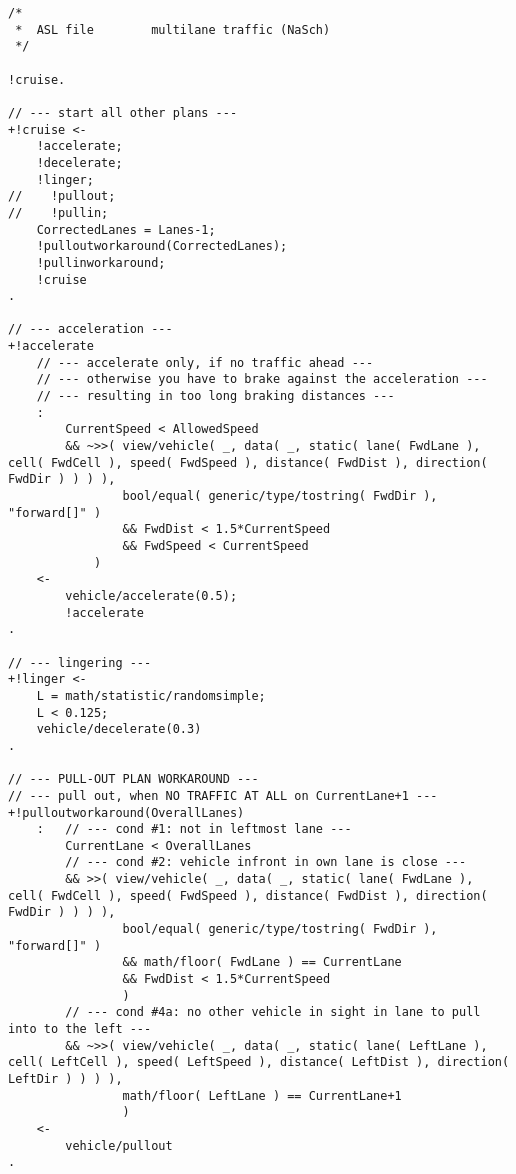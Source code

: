 \begin{lstlisting}[style=asl, 
                   keywords={+!cruise,+!accelerate,+!linger,+!decelerate,+!vehicle/collision}, 
                   keywords={[2]}, 
                   keywords={[3]}, 
                   caption={Agentenscript: NaSch-Modell, mehrspurig},
                   label={lst:multi-lane}]      
/*
 *  ASL file        multilane traffic (NaSch)
 */

!cruise.

// --- start all other plans ---
+!cruise <-
    !accelerate;
    !decelerate;
    !linger;
//    !pullout;
//    !pullin;
    CorrectedLanes = Lanes-1;
    !pulloutworkaround(CorrectedLanes);
    !pullinworkaround;
    !cruise
.

// --- acceleration ---
+!accelerate
    // --- accelerate only, if no traffic ahead ---
    // --- otherwise you have to brake against the acceleration ---
    // --- resulting in too long braking distances ---
    : 
        CurrentSpeed < AllowedSpeed
        && ~>>( view/vehicle( _, data( _, static( lane( FwdLane ), cell( FwdCell ), speed( FwdSpeed ), distance( FwdDist ), direction( FwdDir ) ) ) ),
                bool/equal( generic/type/tostring( FwdDir ), "forward[]" )
                && FwdDist < 1.5*CurrentSpeed
                && FwdSpeed < CurrentSpeed
            )
    <-
        vehicle/accelerate(0.5);
        !accelerate
.

// --- lingering ---
+!linger <-
    L = math/statistic/randomsimple;
    L < 0.125;
    vehicle/decelerate(0.3)
.

// --- PULL-OUT PLAN WORKAROUND ---
// --- pull out, when NO TRAFFIC AT ALL on CurrentLane+1 --- 
+!pulloutworkaround(OverallLanes)
    :   // --- cond #1: not in leftmost lane ---
        CurrentLane < OverallLanes 
        // --- cond #2: vehicle infront in own lane is close ---
        && >>( view/vehicle( _, data( _, static( lane( FwdLane ), cell( FwdCell ), speed( FwdSpeed ), distance( FwdDist ), direction( FwdDir ) ) ) ), 
                bool/equal( generic/type/tostring( FwdDir ), "forward[]" ) 
                && math/floor( FwdLane ) == CurrentLane
                && FwdDist < 1.5*CurrentSpeed 
                )
        // --- cond #4a: no other vehicle in sight in lane to pull into to the left ---
        && ~>>( view/vehicle( _, data( _, static( lane( LeftLane ), cell( LeftCell ), speed( LeftSpeed ), distance( LeftDist ), direction( LeftDir ) ) ) ),
                math/floor( LeftLane ) == CurrentLane+1 
                )
    <-
        vehicle/pullout
.


\end{lstlisting}
